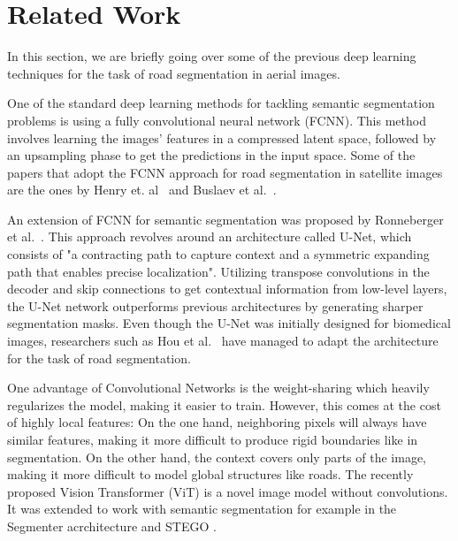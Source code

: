 \documentclass[10pt,conference,compsocconf]{IEEEtran}
\begin{document}
\section{Related Work}
In this section, we are briefly going over some of the previous deep learning techniques for the task of road segmentation in aerial images.

One of the standard deep learning methods for tackling semantic segmentation problems is using a fully convolutional neural network (FCNN). This method involves learning the images' features in a compressed latent space, followed by an upsampling phase to get the predictions in the input space. Some of the papers that adopt the FCNN approach for road segmentation in satellite images are the ones by Henry et. al~\cite{fcnn-road-segmentation-1} and Buslaev et al.~\cite{fcnn-road-segmentation-2}.

An extension of FCNN for semantic segmentation was proposed by Ronneberger et al.~\cite{unet}. This approach revolves around an architecture called U-Net, which consists of "a contracting path to capture context and a symmetric expanding path that enables precise localization". Utilizing transpose convolutions in the decoder and skip connections to get contextual information from low-level layers, the U-Net network outperforms previous architectures by generating sharper segmentation masks. Even though the U-Net was initially designed for biomedical images, researchers such as Hou et al.~\cite{unet-road-segmentation} have managed to adapt the architecture for the task of road segmentation.

One advantage of Convolutional Networks is the weight-sharing which heavily regularizes the model, making it easier to train. However, this comes at the cost of highly local features: On the one hand, neighboring pixels will always have similar features, making it more difficult to produce rigid boundaries like in segmentation. On the other hand, the context covers only parts of the image, making it more difficult to model global structures like roads. The recently proposed Vision Transformer (ViT) \cite{vit} is a novel image model without convolutions. It was extended to work with semantic segmentation for example in the Segmenter acrchitecture \cite{segmenter} and STEGO \cite{stego}.
\end{document}
